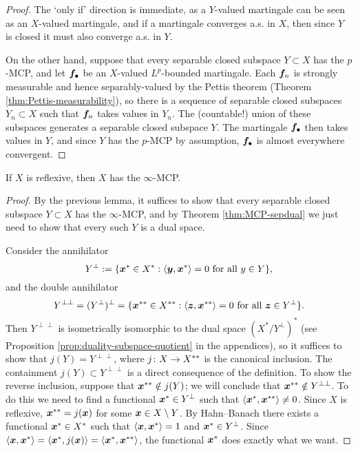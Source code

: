 \begin{proof}
  The `only if' direction is immediate, as a $Y$-valued martingale can be seen as an $X$-valued martingale, and if a martingale converges a.s. in $X$, then since $Y$ is closed it must also converge a.s. in $Y$.

  On the other hand, suppose that every separable closed subspace $Y \subset X$ has the $p$-MCP, and let $\bm{f}_{\bullet}$ be an $X$-valued $L^p$-bounded martingale.
  Each $\bm{f}_n$ is strongly measurable and hence separably-valued by the Pettis theorem (Theorem \ref{thm:Pettis-measurability}), so there is a sequence of separable closed subspaces $Y_n \subset X$ such that $\bm{f}_n$ takes values in $Y_n$.
  The (countable!) union of these subspaces generates a separable closed subspace $Y$.
  The martingale $\bm{f}_{\bullet}$ then takes values in $Y$, and since $Y$ has the $p$-MCP by assumption, $\bm{f}_{\bullet}$ is almost everywhere convergent.
\end{proof}

\begin{cor}\label{cor:MCP-reflexive}
  If $X$ is reflexive, then $X$ has the $\infty$-MCP.
\end{cor}

\begin{proof}
  By the previous lemma, it suffices to show that every separable closed subspace $Y \subset X$ has the $\infty$-MCP, and by Theorem \ref{thm:MCP-sepdual} we just need to show that every such $Y$ is a dual space.
  
  Consider the annihilator
  \begin{equation*}
    Y^{\perp} := \{\bm{x}^* \in X^* :  \text{$\langle \bm{y}, \bm{x}^* \rangle = 0$ for all $y \in Y$}\},
  \end{equation*}
  and the double annihilator
  \begin{equation*}
    Y^{\perp\perp} = (Y^\perp)^\perp = \{\bm{x}^{**} \in X^{**} : \text{$\langle \bm{z}, \bm{x}^{**} \rangle = 0$ for all $\bm{z} \in Y^\perp$}\}.
  \end{equation*}
  Then $Y^{\perp\perp}$ is isometrically isomorphic to the dual space $(X^*/Y^\perp)^{*}$ (see Proposition \ref{prop:duality-subspace-quotient} in the appendices), so it suffices to show that $j(Y) = Y^{\perp\perp}$, where $j \colon X \rightarrow X^{**}$ is the canonical inclusion.
  The containment $j(Y) \subset Y^{\perp\perp}$ is a direct consequence of the definition.
  To show the reverse inclusion, suppose that $\bm{x}^{**} \notin j(Y)$; we will conclude that $\bm{x}^{**} \notin Y^{\perp\perp}$.
  To do this we need to find a functional $\bm{x}^* \in Y^{\perp}$ such that $\langle\bm{x}^*, \bm{x}^{**}\rangle \neq 0$.
  Since $X$ is reflexive, $\bm{x}^{**} = j(\bm{x})$ for some $\bm{x} \in X \setminus Y$.
  By Hahn--Banach there exists a functional $\bm{x}^* \in X^*$ such that $\langle \bm{x}, \bm{x}^* \rangle = 1$ and $\bm{x}^* \in Y^\perp$.
  Since $\langle \bm{x}, \bm{x}^* \rangle = \langle \bm{x}^*, j(\bm{x}) \rangle = \langle \bm{x}^*, \bm{x}^{**} \rangle$, the functional $\bm{x}^*$ does exactly what we want.
\end{proof}

